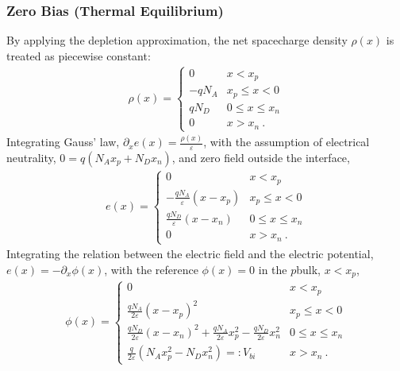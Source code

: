 \documentclass[letterpaper,10pt,english]{jupyterBook}
\begin{document}
\subsubsection{Zero Bias (Thermal Equilibrium)}
\label{\detokenize{ch/solid-state/semiconductors-pn-junctions:zero-bias-thermal-equilibrium}}\label{\detokenize{ch/solid-state/semiconductors-pn-junctions:semiconductors-pn-junctions-depletion-approximation-zero-bias}}
\sphinxAtStartPar
By applying the depletion approximation, the net space\sphinxhyphen{}charge density \(\rho(x)\) is treated as piecewise constant:
\begin{equation*}
\begin{split}\rho(x) = \left\{ \begin{aligned} 
  0 & x \lt x_p \\
 -q N_A & x_p \le x < 0 \\
  q N_D & 0 \le x \le x_n \\
  0 & x \gt x_n \ .
\end{aligned} \right.\end{split}
\end{equation*}
\sphinxAtStartPar
Integrating Gauss’ law, \(\partial_x e(x) = \frac{\rho(x)}{\varepsilon}\), with the assumption of electrical neutrality, \(0 = q (N_A x_p + N_D x_n)\), and zero field outside the interface,
\begin{equation*}
\begin{split}e(x) = \left\{ \begin{aligned}
  0 & x \lt x_p \\
  -\frac{q N_A}{\varepsilon} \left( x - x_p \right) & x_p \le x < 0 \\
   \frac{q N_D}{\varepsilon} \left( x - x_n \right) & 0 \le x \le x_n \\
  0 & x \gt x_n \ .
\end{aligned} \right.\end{split}
\end{equation*}
\sphinxAtStartPar
Integrating the relation between the electric field and the electric potential, \(e(x) = - \partial_x \phi(x)\), with the reference \(\phi(x) = 0\) in the \(p\)\sphinxhyphen{}bulk, \(x < x_p\),
\begin{equation*}
\begin{split}\phi(x) = \left\{ \begin{aligned}
  0 & x \lt x_p \\
  \frac{q N_A}{2 \varepsilon} \left( x - x_p \right)^2 & x_p \le x < 0 \\
  \frac{q N_D}{2 \varepsilon} \left( x - x_n  \right)^2 + \frac{q N_A}{2 \varepsilon} x_p^2 - \frac{q N_D}{2 \varepsilon} x_n^2 & 0 \le x \le x_n \\
  \frac{q}{2 \varepsilon} \left( N_A x_p^2 - N_D x_n^2 \right) =: V_{bi} & x \gt x_n \ .
\end{aligned} \right.\end{split}
\end{equation*}
\end{document}
